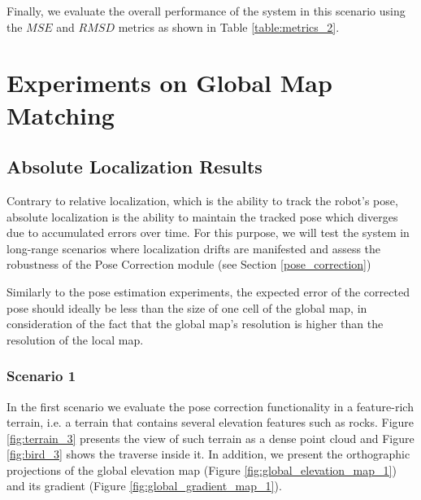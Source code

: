 Finally, we evaluate the overall performance of the system in this scenario
using the $MSE$ and $RMSD$ metrics as shown in Table \ref{table:metrics_2}.


\section{Experiments on Global Map Matching}

\subsection{Absolute Localization Results}

Contrary to relative localization, which is the ability to track the robot's
pose, absolute localization is the ability to maintain the tracked pose
which diverges due to accumulated errors over time.
For this purpose, we will test the system in long-range
scenarios where localization drifts are manifested and assess the robustness
of the Pose Correction module (see Section \ref{pose_correction})

Similarly to the pose estimation experiments, the expected error of the
corrected pose should ideally be less than the size of one cell of the global
map, in consideration of the fact that the global map's resolution is higher
than the resolution of the local map.

\subsubsection{Scenario 1}

In the first scenario we evaluate the pose correction functionality in
a feature-rich terrain, i.e. a terrain that contains several elevation
features such as rocks.
Figure \ref{fig:terrain_3} presents the view of such terrain as a dense
point cloud and Figure \ref{fig:bird_3} shows the traverse inside it.
In addition, we present the orthographic projections of the global
elevation map (Figure \ref{fig:global_elevation_map_1}) and its gradient
(Figure \ref{fig:global_gradient_map_1}).

